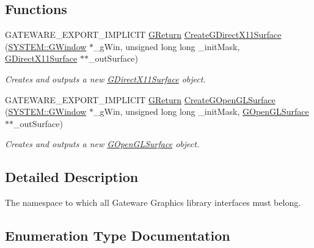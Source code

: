 \subsection*{Functions}
\begin{DoxyCompactItemize}
\item 
G\+A\+T\+E\+W\+A\+R\+E\+\_\+\+E\+X\+P\+O\+R\+T\+\_\+\+I\+M\+P\+L\+I\+C\+IT \mbox{\hyperlink{namespace_g_w_a67a839e3df7ea8a5c5686613a7a3de21}{G\+Return}} \mbox{\hyperlink{namespace_g_w_1_1_g_r_a_p_h_i_c_s_a3fc9ce5171f60466f1e8784ea13b31ce}{Create\+G\+Direct\+X11\+Surface}} (\mbox{\hyperlink{class_g_w_1_1_s_y_s_t_e_m_1_1_g_window}{S\+Y\+S\+T\+E\+M\+::\+G\+Window}} $\ast$\+\_\+g\+Win, unsigned long long \+\_\+init\+Mask, \mbox{\hyperlink{class_g_w_1_1_g_r_a_p_h_i_c_s_1_1_g_direct_x11_surface}{G\+Direct\+X11\+Surface}} $\ast$$\ast$\+\_\+out\+Surface)
\begin{DoxyCompactList}\small\item\em Creates and outputs a new \mbox{\hyperlink{class_g_w_1_1_g_r_a_p_h_i_c_s_1_1_g_direct_x11_surface}{G\+Direct\+X11\+Surface}} object. \end{DoxyCompactList}\item 
G\+A\+T\+E\+W\+A\+R\+E\+\_\+\+E\+X\+P\+O\+R\+T\+\_\+\+I\+M\+P\+L\+I\+C\+IT \mbox{\hyperlink{namespace_g_w_a67a839e3df7ea8a5c5686613a7a3de21}{G\+Return}} \mbox{\hyperlink{namespace_g_w_1_1_g_r_a_p_h_i_c_s_a67a126b8d3c2fabc556008d2460a3b43}{Create\+G\+Open\+G\+L\+Surface}} (\mbox{\hyperlink{class_g_w_1_1_s_y_s_t_e_m_1_1_g_window}{S\+Y\+S\+T\+E\+M\+::\+G\+Window}} $\ast$\+\_\+g\+Win, unsigned long long \+\_\+init\+Mask, \mbox{\hyperlink{class_g_w_1_1_g_r_a_p_h_i_c_s_1_1_g_open_g_l_surface}{G\+Open\+G\+L\+Surface}} $\ast$$\ast$\+\_\+out\+Surface)
\begin{DoxyCompactList}\small\item\em Creates and outputs a new \mbox{\hyperlink{class_g_w_1_1_g_r_a_p_h_i_c_s_1_1_g_open_g_l_surface}{G\+Open\+G\+L\+Surface}} object. \end{DoxyCompactList}\end{DoxyCompactItemize}


\subsection{Detailed Description}
The namespace to which all Gateware Graphics library interfaces must belong. 

\subsection{Enumeration Type Documentation}
\mbox{\label{namespace_g_w_1_1_g_r_a_p_h_i_c_s_afbd9d6f65375744d2338ce060d42c85b}} 
